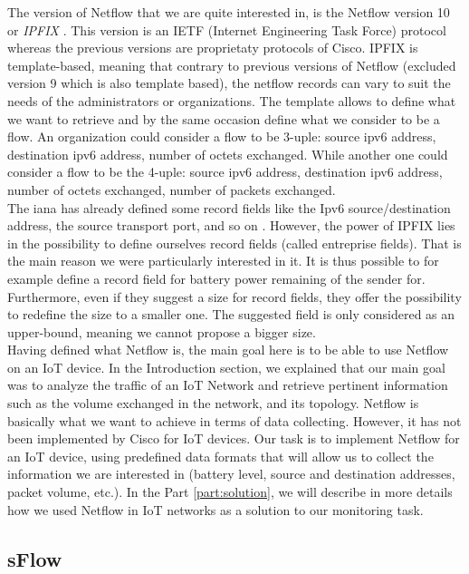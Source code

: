 The version of Netflow that we are quite interested in, is the Netflow version 10 or \textit{IPFIX} \cite{claise2013rfc}. This version is an IETF (Internet Engineering Task Force) protocol whereas the previous versions are proprietaty protocols of Cisco. IPFIX is template-based, meaning that contrary to previous versions of Netflow (excluded version 9 which is also template based), the netflow records can vary to suit the needs of the administrators or organizations. The template allows to define what we want to retrieve and by the same occasion define what we consider to be a flow. An organization could consider a flow to be 3-uple: source ipv6 address, destination ipv6 address, number of octets exchanged. While another one could consider a flow to be the 4-uple: source ipv6 address, destination ipv6 address, number of octets exchanged, number of packets exchanged. \\

The \acrfull{iana} has already defined some record fields like the Ipv6 source/destination address, the source transport port, and so on \cite{website:ipfix_entities}. However, the power of IPFIX lies in the possibility to define ourselves record fields (called entreprise fields). That is the main reason we were particularly interested in it. It is thus possible to for example define a record field for battery power remaining of the sender for. Furthermore, even if they suggest a size for record fields, they offer the possibility to redefine the size to a smaller one. The suggested field is only considered as an upper-bound, meaning we cannot propose a bigger size.\\

Having defined what Netflow is, the main goal here is to be able to use Netflow on an IoT device. In the Introduction section, we explained that our main goal was to analyze the traffic of an IoT Network and retrieve pertinent information such as the volume exchanged in the network, and its topology. Netflow is basically what we want to achieve in terms of data collecting. However, it has not been implemented by Cisco for IoT devices. Our task is to implement Netflow for an IoT device, using predefined data formats that will allow us to collect the information we are interested in (battery level, source and destination addresses, packet volume, etc.). In the Part \ref{part:solution}, we will describe in more details how we used Netflow in IoT networks as a solution to our monitoring task.

\subsection{sFlow}

